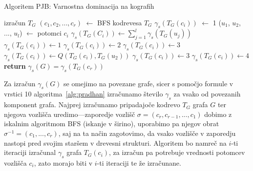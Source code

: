 \documentclass[12pt,a4paper,twoside]{article}
\theoremstyle{definition} %
\theoremstyle{plain} %
\numberwithin{equation}{section}  %
\begin{document}
\begin{algorithm}[h!]
\caption{Algoritem PJB: Varnostna dominacija na kografih}\label{alg:pradhan}
\begin{algorithmic}[1]
\State izračun $T_G$
\State $(c_1, c_2, ..., c_r)$ $\leftarrow$ BFS kodrevesa $T_G$
    	\State $\gamma_s(T_G(c_i))$  $\leftarrow$ 1
    \Else
    	\State ($u_1$, $u_2$, ..., $u_l$) $\leftarrow$ potomci $c_i$
        	\State $\gamma_s(T_G(C_i)) \leftarrow \sum\limits_{j=1}^l \gamma_s(T_G(u_j))$
          \Else  \hfill{}
             	\State $\gamma_s(T_G(c_i)) \leftarrow 1$
             	\State $\gamma_s(T_G(c_i)) \leftarrow 2$
                 \State $\gamma_s(T_G(c_i)) \leftarrow 3$
                  	\State $\gamma_s(T_G(c_i)) \leftarrow Q(T_G(c_i), T_G(u_2))$
                    		\State $\gamma_s(T_G(c_i)) \leftarrow 3$
                    	\Else
                    		\State $\gamma_s(T_G(c_i)) \leftarrow 4$
                    	\EndIf
                  \EndIf
                \EndIf
            \EndIf
\EndFor
\State \textbf{return} $\gamma_s(G) = \gamma_s(T_G(c_r))$
\EndFunction
\end{algorithmic}
\end{algorithm}

Za izračun $\gamma_s(G)$ se omejimo na povezane grafe, sicer s pomočjo formule v vrstici 10 algoritma~\ref{alg:pradhan} izračunamo število $\gamma_s$ za vsako od povezanih komponent grafa. Najprej izračunamo pripadajoče kodrevo $T_G$ grafa $G$ ter njegova vozlišča uredimo---zaporedje vozlišč $\sigma = (c_r, c_{r-1}, ..., c_1)$ dobimo z iskalnim algoritmom BFS (iskanje v širino), uporabimo pa njegov obrat $\sigma ^{-1} = (c_1, ..., c_r)$, saj na ta način zagotovimo, da vsako vozlišče v zaporedju nastopi pred svojim staršem v drevesni strukturi. Algoritem bo namreč na $i$-ti iteraciji izračunal $\gamma_s$ grafa $T_G(c_i)$, za izračun pa potrebuje vrednosti potomcev vozlišča $c_i$, zato morajo biti v $i$-ti iteraciji te že izračunane.
\end{document}
